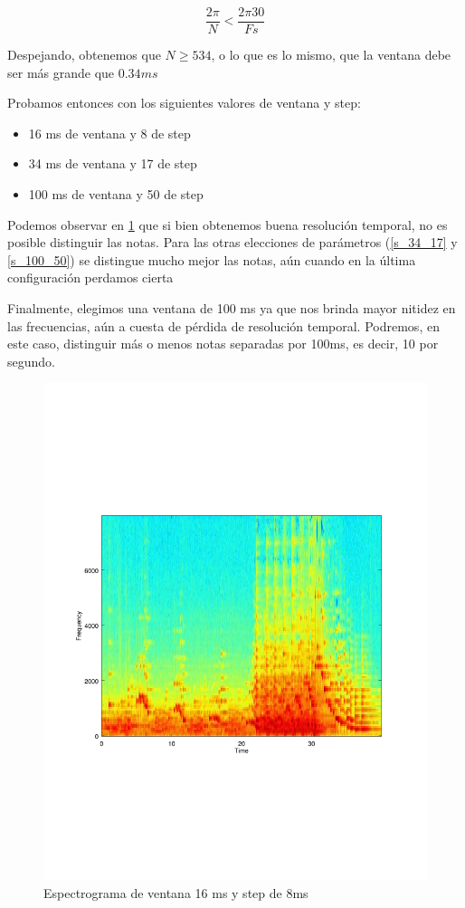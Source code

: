 \documentclass[paper=a4, fontsize=11pt]{scrartcl} %
\numberwithin{equation}{section} %
\numberwithin{figure}{section} %
\numberwithin{table}{section} %
\begin{document}
\begin{equation}
 \frac{2\pi}{N} < \frac{2\pi 30}{Fs}
\end{equation}

Despejando, obtenemos que $N \geq 534$, o lo que es lo mismo, que la ventana debe ser más grande que $0.34ms$

Probamos entonces con los siguientes valores de ventana y step:

\begin{itemize}
    \item 16 ms de ventana y 8 de step
    \item 34 ms de ventana y 17 de step
    \item 100 ms de ventana y 50 de step

\end{itemize}

Podemos observar en \ref{s_16_8} que si bien obtenemos buena resolución temporal, no es posible distinguir las notas. Para las otras elecciones de parámetros (\ref{s_34_17} y \ref{s_100_50}) se distingue mucho mejor las notas, aún cuando en la última configuración perdamos cierta

Finalmente, elegimos una ventana de 100 ms ya que nos brinda mayor nitidez en las frecuencias, aún a cuesta de pérdida de resolución temporal. Podremos, en este caso, distinguir más o menos notas separadas por 100ms, es decir, 10 por segundo.

\begin{figure}[th!]
\includegraphics[width=\textwidth]{../images/specgram_w16s8.pdf}
\caption{Espectrograma de ventana 16 ms y step de 8ms}
\label{s_16_8}
\end{figure}
\end{document}
